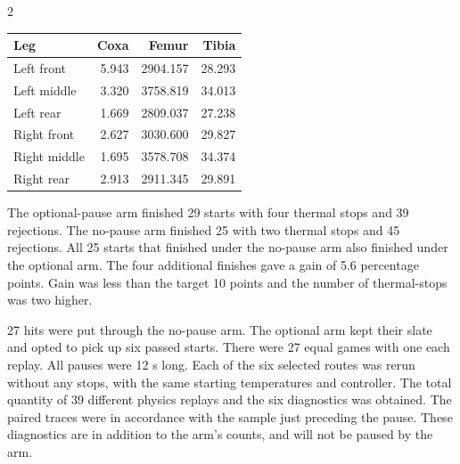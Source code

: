 \documentclass{ieeeaccess}
\makeatletter
\newenvironment{appendixdisplay}[1]
  {\par\addvspace{4pt}\noindent\begin{minipage}{\linewidth}\def\@captype{#1}}
  {\end{minipage}\par\addvspace{6pt}}
\makeatother
\begin{document}
\begin{multicols}{2}
\begin{appendixdisplay}{table}
\caption{Fitted squared torque during a 12 s hold in $(\mathrm{N}{\cdot}\mathrm{m})^2$}
\label{tab:hold-loads}
\centering
\footnotesize
\renewcommand{\arraystretch}{1.12}
\begin{tabular*}{\linewidth}{@{\extracolsep{\fill}}lrrr@{}}
\hline
Leg & Coxa & Femur & Tibia \\
\hline
Left front & 5.943 & 2904.157 & 28.293 \\
Left middle & 3.320 & 3758.819 & 34.013 \\
Left rear & 1.669 & 2809.037 & 27.238 \\
Right front & 2.627 & 3030.600 & 29.827 \\
Right middle & 1.695 & 3578.708 & 34.374 \\
Right rear & 2.913 & 2911.345 & 29.891 \\
\hline
\end{tabular*}
\end{appendixdisplay}

The optional-pause arm finished 29 starts with four thermal stops and 39 rejections. The no-pause arm finished 25 with two thermal stops and 45 rejections. All 25 starts that finished under the no-pause arm also finished under the optional arm. The four additional finishes gave a gain of 5.6 percentage points. Gain was less than the target 10 points and the number of thermal-stops was two higher.

27 hits were put through the no-pause arm. The optional arm kept their slate and opted to pick up six passed starts. There were 27 equal games with one each replay. All pauses were 12 s long. Each of the six selected routes was rerun without any stops, with the same starting temperatures and controller. The total quantity of 39 different physics replays and the six diagnostics was obtained. The paired traces were in accordance with the sample just preceding the pause. These diagnostics are in addition to the arm's counts, and will not be paused by the arm.

\end{multicols}
\end{document}
